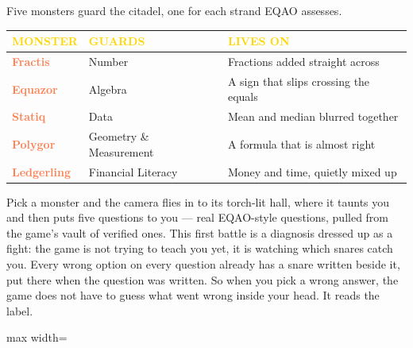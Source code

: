 \documentclass[11pt]{article}
\begin{document}
Five monsters guard the citadel, one for each strand EQAO assesses.

\vspace{0.4em}
\begin{center}
\begin{tabularx}{0.97\textwidth}{@{}>{\sffamily\bfseries}l l X@{}}
\toprule
\textcolor{Gold}{\sffamily MONSTER} & \textcolor{Gold}{\sffamily GUARDS} &
\textcolor{Gold}{\sffamily LIVES ON}\\
\midrule
\textcolor{Coral}{Fractis} & Number & Fractions added straight across\\
\textcolor{Coral}{Equazor} & Algebra & A sign that slips crossing the equals\\
\textcolor{Coral}{Statiq} & Data & Mean and median blurred together\\
\textcolor{Coral}{Polygor} & Geometry \& Measurement & A formula that is almost right\\
\textcolor{Coral}{Ledgerling} & Financial Literacy & Money and time, quietly mixed up\\
\bottomrule
\end{tabularx}
\end{center}
\vspace{0.4em}

Pick a monster and the camera flies in to its torch-lit hall, where it taunts
you and then puts five questions to you --- real EQAO-style questions, pulled
from the game's vault of verified ones. This first battle is a diagnosis
dressed up as a fight: the game is not trying to teach you yet, it is watching
which snares catch you. Every wrong option on every question already has a snare
written beside it, put there when the question was written. So when you pick a
wrong answer, the game does not have to guess what went wrong inside your head.
It reads the label.

\vspace{0.5em}
\begin{center}
\begin{adjustbox}{max width=\textwidth}
\end{adjustbox}
\end{center}
\end{document}
